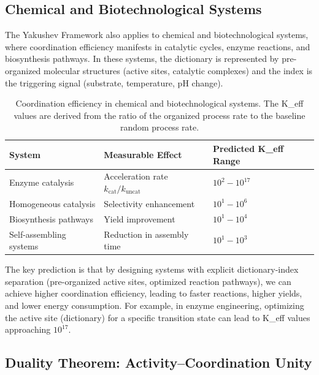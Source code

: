 \documentclass[11pt,a4paper]{article}
\begin{document}
\subsection{Chemical and Biotechnological Systems}
\label{subsec:chemical-systems}

The Yakushev Framework also applies to chemical and biotechnological systems, where coordination efficiency manifests in catalytic cycles, enzyme reactions, and biosynthesis pathways. In these systems, the dictionary is represented by pre-organized molecular structures (active sites, catalytic complexes) and the index is the triggering signal (substrate, temperature, pH change).

\begin{table}[htbp]
	\centering
	\small
	\begin{tabular}{p{}p{}p{}}
		\toprule
		\textbf{System} & \textbf{Measurable Effect} & \textbf{Predicted K\_eff Range} \\
		\midrule
		Enzyme catalysis & Acceleration rate $k_{\text{cat}}/k_{\text{uncat}}$ & $10^2 - 10^{17}$ \\
		Homogeneous catalysis & Selectivity enhancement & $10^1 - 10^6$ \\
		Biosynthesis pathways & Yield improvement & $10^1 - 10^4$ \\
		Self-assembling systems & Reduction in assembly time & $10^1 - 10^3$ \\
		\bottomrule
	\end{tabular}
	\caption{Coordination efficiency in chemical and biotechnological systems. The K\_eff values are derived from the ratio of the organized process rate to the baseline random process rate.}
	\label{tab:chemical-keff}
\end{table}

The key prediction is that by designing systems with explicit dictionary-index separation (pre-organized active sites, optimized reaction pathways), we can achieve higher coordination efficiency, leading to faster reactions, higher yields, and lower energy consumption. For example, in enzyme engineering, optimizing the active site (dictionary) for a specific transition state can lead to K\_eff values approaching $10^{17}$.

\subsection{Duality Theorem: Activity–Coordination Unity}
\end{document}
